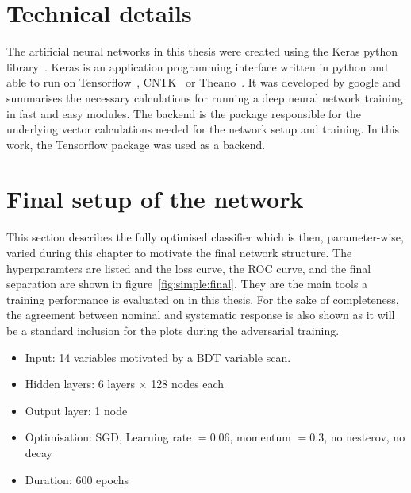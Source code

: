 \section{Technical details}
\label{sec:technicals}

The artificial neural networks in this thesis were created using the Keras python library~\cite{chollet2015keras}.
Keras is an application programming interface written in python and able to run on Tensorflow~\cite{tensorflow2015-whitepaper}, CNTK~\cite{cntk} or Theano~\cite{theano}. It was developed by google and summarises the necessary calculations for running a deep neural network training in fast and easy modules.
The backend is the package responsible for the underlying vector calculations needed for the network setup and training. In this work, the Tensorflow package was used as a backend.

\section{Final setup of the network}
\label{sec:simplesetup}

This section describes the fully optimised classifier which is then, parameter-wise, varied during this chapter to motivate the final network structure.
The hyperparamters are listed and the loss curve, the ROC curve, and the final separation are shown in figure~\ref{fig:simple:final}. They are the main tools a training performance is evaluated on in this thesis. For the sake of completeness, the agreement between nominal and systematic response is also shown as it will be a standard inclusion for the plots during the adversarial training.


\begin{itemize}
\item Input: \num{14} variables motivated by a BDT variable scan\cite{Finelli:2667560}.
\item Hidden layers: \num{6} \ELU layers $\times$ \num{128} nodes each
\item Output layer: \num{1} \SIGMOID node
\item Optimisation: SGD, Learning rate $=0.06$, momentum $=0.3$, no nesterov, no decay
\item Duration: 600 epochs
\end{itemize}

